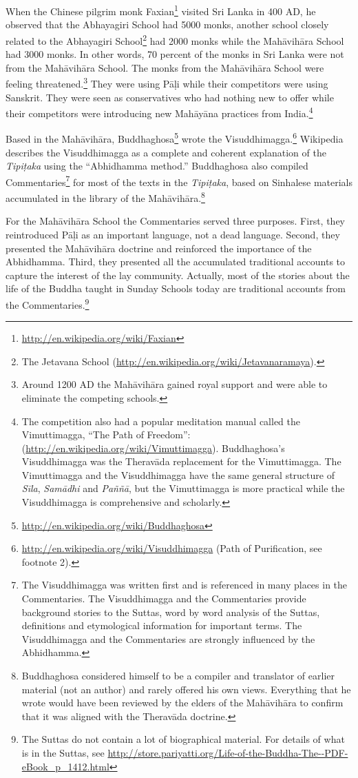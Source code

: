 When the Chinese pilgrim monk Faxian\footnote{\url{http://en.wikipedia.org/wiki/Faxian}} visited Sri Lanka in 400 AD, he observed that the Abhayagiri School had 5000 monks, another school closely related to the Abhayagiri School\footnote{The Jetavana School (\url{http://en.wikipedia.org/wiki/Jetavanaramaya}).} had 2000 monks while the Mahāvihāra School had 3000 monks. In other words, 70 percent of the monks in Sri Lanka were not from the Mahāvihāra School. The monks from the Mahāvihāra School were feeling threatened.\footnote{Around 1200 AD the Mahāvihāra gained royal support and were able to eliminate the competing schools.} They were using Pāḷi while their competitors were using Sanskrit. They were seen as conservatives who had nothing new to offer while their competitors were introducing new Mahāyāna practices from India.\footnote{The competition also had a popular meditation manual called the Vimuttimagga, “The Path of Freedom”: (\url{http://en.wikipedia.org/wiki/Vimuttimagga}). Buddhaghosa’s Visuddhimagga was the Theravāda replacement for the Vimuttimagga. The Vimuttimagga and the Visuddhimagga have the same general structure of \textit{Sīla}, \textit{Samādhi} and \textit{Paññā}, but the Vimuttimagga is more practical while the Visuddhimagga is comprehensive and scholarly.} 

Based in the Mahāvihāra, Buddhaghosa\footnote{\url{http://en.wikipedia.org/wiki/Buddhaghosa}} wrote the Visuddhimagga.\footnote{\url{http://en.wikipedia.org/wiki/Visuddhimagga} (Path of Purification, see footnote 2).} Wikipedia describes the Visuddhimagga as a complete and coherent explanation of the \textit{Tipiṭaka} using the “Abhidhamma method.” Buddhaghosa also compiled Commentaries\footnote{The Visuddhimagga was written first and is referenced in many places in the Commentaries. The Visuddhimagga and the Commentaries provide background stories to the Suttas, word by word analysis of the Suttas, definitions and etymological information for important terms. The Visuddhimagga and the Commentaries are strongly influenced by the Abhidhamma.} for most of the texts in the \textit{Tipiṭaka}, based on Sinhalese materials accumulated in the library of the Mahāvihāra.\footnote{Buddhaghosa considered himself to be a compiler and translator of earlier material (not an author) and rarely offered his own views. Everything that he wrote would have been reviewed by the elders of the Mahāvihāra to confirm that it was aligned with the Theravāda doctrine.}

For the Mahāvihāra School the Commentaries served three purposes. First, they reintroduced Pāḷi as an important language, not a dead language. Second, they presented the Mahāvihāra doctrine and reinforced the importance of the Abhidhamma. Third, they presented all the accumulated traditional accounts to capture the interest of the lay community. Actually, most of the stories about the life of the Buddha taught in Sunday Schools today are traditional accounts from the Commentaries.\footnote{The Suttas do not contain a lot of biographical material. For details of what is in the Suttas, see \url{http://store.pariyatti.org/Life-of-the-Buddha-The--PDF-eBook_p_1412.html}}

